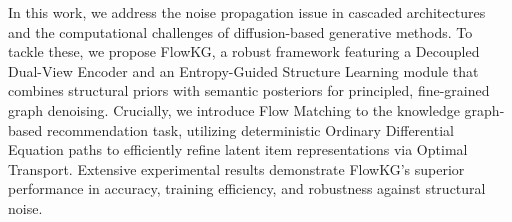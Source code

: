 
In this work, we address the noise propagation issue in cascaded architectures and the computational challenges of diffusion-based generative methods. To tackle these, we propose FlowKG, a robust framework featuring a Decoupled Dual-View Encoder and an Entropy-Guided Structure Learning module that combines structural priors with semantic posteriors for principled, fine-grained graph denoising. Crucially, we introduce Flow Matching to the knowledge graph-based recommendation task, utilizing deterministic Ordinary Differential Equation paths to efficiently refine latent item representations via Optimal Transport. Extensive experimental results demonstrate FlowKG's superior performance in accuracy, training efficiency, and robustness against structural noise.

